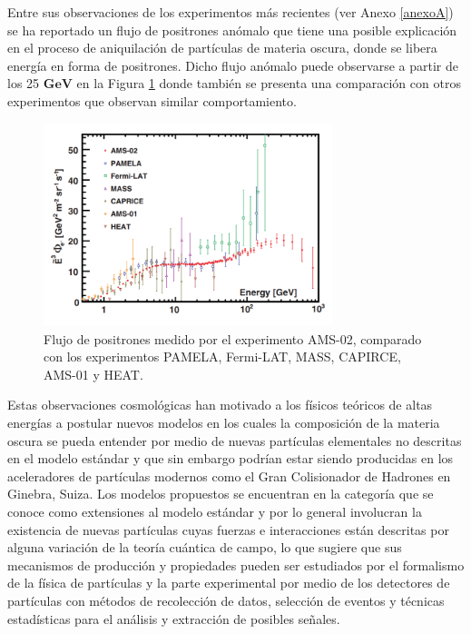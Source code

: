 Entre sus observaciones de los experimentos más recientes (ver Anexo \ref{anexoA}) se ha reportado un flujo de positrones anómalo que tiene una posible explicación en el proceso de aniquilación de partículas de materia oscura, donde se libera energía en forma de positrones. Dicho flujo anómalo puede observarse
a partir de los 25 $\mathbf{GeV}$ en la Figura \ref{fig:AMS_positronflux} donde también se presenta una comparación con otros experimentos que observan similar comportamiento.

\begin{figure}[htbp]
    \centering
    \includegraphics[width=0.75\textwidth]{Fisica_de_Particulas/imagenes/AMS_positronflux.png}
    \caption{Flujo de positrones medido por el experimento AMS-02, comparado con los experimentos PAMELA, Fermi-LAT, MASS, CAPIRCE, AMS-01 y HEAT.}
    \label{fig:AMS_positronflux}
\end{figure}

Estas observaciones cosmológicas han motivado a los físicos teóricos de altas energías a postular nuevos modelos en los cuales la composición de la materia oscura se pueda entender por medio de nuevas partículas elementales no descritas en el modelo estándar y que sin embargo podrían estar siendo producidas en los aceleradores de partículas modernos como el Gran Colisionador de Hadrones en Ginebra, Suiza. Los modelos propuestos se encuentran en la categoría que se conoce como extensiones al modelo estándar y por lo general involucran la existencia de nuevas partículas cuyas fuerzas e interacciones están descritas por alguna variación de la teoría cuántica de campo, lo que sugiere que sus mecanismos de producción y propiedades pueden ser estudiados por el formalismo de la física de partículas y la parte experimental por medio de los detectores de partículas con métodos de recolección de datos, selección de eventos y técnicas estadísticas para el análisis y extracción de posibles señales.




